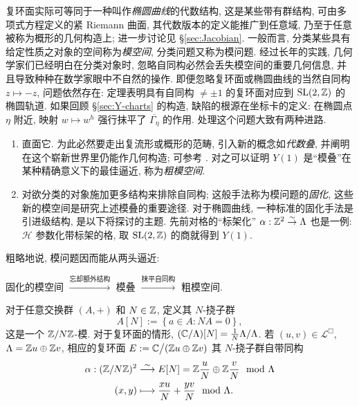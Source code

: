 复环面实际可等同于一种叫作\emph{椭圆曲线}的代数结构, 这是某些带有群结构, 可由多项式方程定义的紧 Riemann 曲面, 其代数版本的定义能推广到任意域, 乃至于任意被称为概形的几何构造上; 进一步讨论见 \S\ref{sec:Jacobian}. 一般而言, 分类某些具有给定性质之对象的空间称为\emph{模空间}, 分类问题又称为模问题. 经过长年的实践, 几何学家们已经明白在分类对象时, 忽略自同构必然会丢失模空间的重要几何信息, 并且导致种种在数学家眼中不自然的操作. 即便忽略复环面或椭圆曲线的当然自同构 $z \mapsto -z$, 问题依然存在: 定理表明具有自同构 $\neq \pm 1$ 的复环面对应到 $\operatorname{SL}(2,\mathbb{Z})$ 的椭圆轨道. 如果回顾 \S\ref{sec:Y-charts} 的构造, 缺陷的根源在坐标卡的定义: 在椭圆点 $\eta$ 附近, 映射 $w \mapsto w^h$ 强行抹平了 $\overline{\Gamma_\eta}$ 的作用. 处理这个问题大致有两种进路.
\begin{enumerate}
	\item 直面它. 为此必然要走出复流形或概形的范畴, 引入新的概念如\emph{代数叠}, 并阐明在这个崭新世界里仍能作几何构造; 可参考 \cite{LZ}. 对之可以证明 $Y(1)$ 是``模叠''在某种精确意义下的最佳逼近, 称为\emph{粗模空间}. 
	\item 对欲分类的对象施加更多结构来排除自同构; 这般手法称为模问题的\emph{固化}, 这些新的模空间是研究上述模叠的重要途径. 对于椭圆曲线, 一种标准的固化手法是引进级结构, 是以下将探讨的主题. 先前对格的``标架化'' $\alpha: \mathbb{Z}^2 \stackrel{\sim}{\rightarrow} \Lambda$ 也是一例: $\mathcal{H}$ 参数化带标架的格, 取 $\operatorname{SL}(2, \mathbb{Z})$ 的商就得到 $Y(1)$.
\end{enumerate}
粗略地说, 模问题因而能从两头逼近:
\begin{center}
	固化的模空间 $\xrightarrow{\text{忘却额外结构}}$ 模叠 $\xrightarrow{\text{抹平自同构}}$ 粗模空间.
\end{center}

对于任意交换群 $(A,+)$ 和 $N \in \mathbb{Z}$, 定义其 $N$-挠子群
\[ A[N] := \left\{a \in A: NA = 0 \right\}, \]
这是一个 $\mathbb{Z}/N\mathbb{Z}$-模. 对于复环面的情形, $(\mathbb{C}/\Lambda)[N] = \frac{1}{N} \Lambda / \Lambda$. 若 $(u, v) \in \mathcal{L}^\Box$, $\Lambda = \mathbb{Z} u \oplus \mathbb{Z} v$, 相应的复环面 $E := \mathbb{C} \big/ (\mathbb{Z} u \oplus \mathbb{Z} v)$ 其 $N$-挠子群自带同构
\begin{equation}\label{eqn:std-level-structure}\begin{aligned}
	\alpha: (\mathbb{Z}/N\mathbb{Z})^2 & \stackrel{\sim}{\longrightarrow} E[N] = \mathbb{Z} \frac{u}{N} \oplus \mathbb{Z} \frac{v}{N} \mod \Lambda \\
	(x, y) & \longmapsto \frac{xu}{N} + \frac{yv}{N} \mod \Lambda .
\end{aligned}\end{equation}

